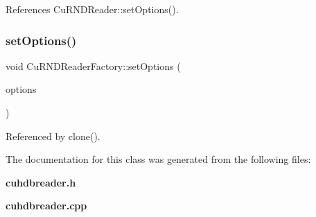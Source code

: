 References Cu\+R\+N\+D\+Reader\+::set\+Options().

\mbox{\label{classCuHdbReaderFactory_a2ad31ac349d423075c244791ca107f2c}} 
\subsubsection{setOptions()}
{\footnotesize\ttfamily void Cu\+R\+N\+D\+Reader\+Factory\+::set\+Options (\begin{DoxyParamCaption}\item[{const Cu\+Data \&}]{options }\end{DoxyParamCaption})\hspace{0.3cm}{\ttfamily [virtual]}}



Referenced by clone().



The documentation for this class was generated from the following files\+:\begin{DoxyCompactItemize}
\item 
\textbf{ cuhdbreader.\+h}\item 
\textbf{ cuhdbreader.\+cpp}\end{DoxyCompactItemize}
